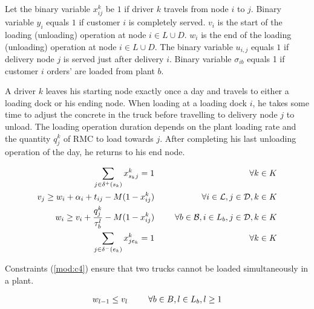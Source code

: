 \documentclass{article}
\begin{document}
Let the binary variable $x^{k}_{ij}$ be $1$ if driver $k$ travels from node $i$ to $j$. Binary variable $y_i$ equals $1$ if customer $i$ is completely served. $v_i$ is the start of the loading (unloading) operation at node $i \in L \cup D$. $w_i$ is the end of the loading (unloading) operation at node $i \in L\cup D$. The binary variable $u_{i,j}$ equals $1$ if delivery node $j$ is served just after delivery $i$.  Binary variable $\sigma_{ib}$ equals 1 if customer $i$ orders' are loaded from plant $b$. %

A driver $k$ leaves his starting node exactly once a day and travels to either a loading dock or his ending node. When loading at a loading dock $i$, he takes some time to adjust the concrete in the truck before travelling to delivery node $j$ to unload. The loading operation duration depends on the plant loading rate and the quantity $q^k_j$ of RMC to load towards $j$. After completing his last unloading operation of the day, he returns to his end node.

\begin{alignat}{3}
\label{mod:c2} \sum_{j \in \delta^{+}(s_k) }{x^k_{s_kj}} = 1 & \text{ } &\forall k \in K \\
\label{mod:c3}   v_j \geq  w_i + \alpha_{i} + t_{ij} - M(1-x^{k}_{ij}) & \text{ }& \forall i \in \mathcal{L}, j \in \mathcal{D},  k \in K \\
\label{mod:c4}  w_{i} \geq v_{i}  + \frac{q^k_j}{\tau^l_b} -M(1- x^{k}_{ij}) &  \hspace{5mm} &\forall  b \in \mathcal{B},  i \in L_{b}, j \in \mathcal{D}, k \in K \\
\label{mod:c5} \sum_{j \in \delta^{-}(e_k)}{x^k_{je_k}} = 1 & \text{ }   &  \forall k \in K
\end{alignat}

Constraints (\ref{mod:c4}) ensure that two trucks cannot be loaded simultaneously in a plant.

\begin{alignat}{3}
    \label{mod:c6}       w_{l-1} \leq v_{l} & \hspace{5mm} &\forall  b \in B,  l \in L_{b}, l \geq 1 
\end{alignat}
\end{document}
